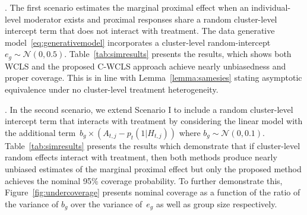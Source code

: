 \documentclass[lineno]{biometrika}
\begin{document}

. The first scenario estimates the marginal proximal effect when an individual-level moderator exists and proximal responses share a random cluster-level intercept term that does not interact with treatment. The data generative model~\eqref{eq:generativemodel} incorporates a cluster-level random-intercept $e_g \sim \mathcal{N}(0,0.5)$.
Table~\ref{tab:simresults} presents the results, which shows both WCLS and the proposed C-WCLS approach achieve nearly unbiasedness and proper coverage. This is in line with Lemma~\ref{lemma:samesies} stating asymptotic equivalence under no cluster-level treatment heterogeneity.

. In the second scenario, we extend Scenario I to include a random cluster-level intercept term that interacts with treatment by considering the linear model with the additional term~$b_g \times (A_{t,j} -p_t(1|H_{t,j}))$
where $b_g \sim \mathcal{N}(0,0.1)$.
Table~\ref{tab:simresults} presents the results which demonstrate that if cluster-level random effects interact with treatment, then both methods produce nearly unbiased estimates of the marginal proximal effect but only the proposed method achieves the nominal 95\% coverage probability. To further demonstrate this, Figure~\ref{fig:undercoverage} presents nominal coverage as a function of the ratio of the variance of $b_g$ over the variance of~$e_g$ as well as group size respectively.  
\end{document}
